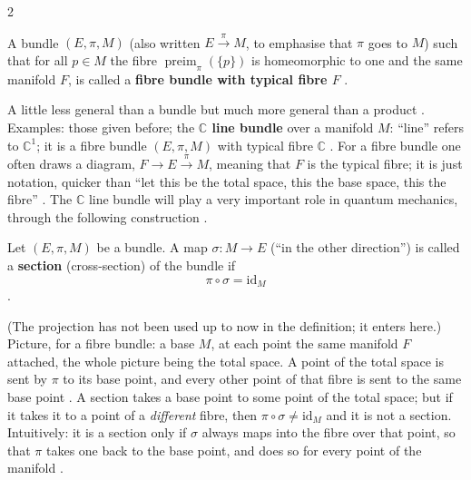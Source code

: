 \begin{paracol}{2}
\begin{definition}\label{def:mf-fibre-bundle}
A bundle $(E,\pi,M)$ (also written $E\xrightarrow{\ \pi\ }M$, to emphasise that $\pi$ goes to $M$) such that for all $p\in M$ the fibre $\operatorname{preim}_\pi(\{p\})$ is homeomorphic to one and the same manifold $F$, is called a \textbf{fibre bundle with typical fibre $F$}
.
\end{definition}
A little less general than a bundle but much more general than a product . Examples: those given before; the \textbf{$\mathbb C$ line bundle} over a manifold $M$: ``line'' refers to $\mathbb C^1$; it is a fibre bundle $(E,\pi,M)$ with typical fibre $\mathbb C$
. For a fibre bundle one often draws a diagram, $F\to E\xrightarrow{\pi}M$, meaning that $F$ is the typical fibre; it is just notation, quicker than ``let this be the total space, this the base space, this the fibre''
. The $\mathbb C$ line bundle will play a very important role in quantum mechanics, through the following construction .

\begin{definition}\label{def:mf-section}
Let $(E,\pi,M)$ be a bundle. A map $\sigma\colon M\to E$ (``in the other direction'') is called a \textbf{section} (cross-section) of the bundle if
\[
  \pi\circ\sigma=\mathrm{id}_M
\]
.
\end{definition}
(The projection has not been used up to now in the definition; it enters here.) Picture, for a fibre bundle: a base $M$, at each point the same manifold $F$ attached, the whole picture being the total space. A point of the total space is sent by $\pi$ to its base point, and every other point of that fibre
is sent to the same base point . A section takes a base point to some point of the total space; but if it takes it to a point of a \emph{different} fibre, then $\pi\circ\sigma\ne\mathrm{id}_M$ and it is not a section. Intuitively:
it is a section only if $\sigma$ always maps into the fibre over that point, so that $\pi$ takes one back to the base point, and does so for every point of the manifold .


\end{paracol}
